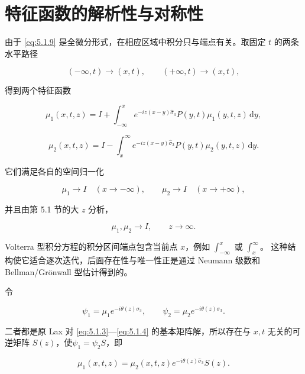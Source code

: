 \documentclass[
    lang=cn,
    scheme=chinese,
    mode=simple,
    device=normal,
    color=blue,
    math=cm,
    thmcnt=section,
    12pt,
    nowatermark
]{elegantbook}
\begin{document}
\section{特征函数的解析性与对称性}

由于 \eqref{eq:5.1.9} 是全微分形式，在相应区域中积分只与端点有关。取固定 $t$ 的两条水平路径

\[
    (-\infty,t)\to(x,t),
    \qquad
    (+\infty,t)\to(x,t),
\]

得到两个特征函数

\begin{equation}
    \mu_1(x,t,z)
    =
    I+
    \int_{-\infty}^{x}
    e^{-iz(x-y)\widehat{\sigma}_3}
    P(y,t)\mu_1(y,t,z)\,\mathrm dy,
    \tag{5.2.1}
    \label{eq:5.2.1}
\end{equation}

\begin{equation}
    \mu_2(x,t,z)
    =
    I-
    \int_x^{\infty}
    e^{-iz(x-y)\widehat{\sigma}_3}
    P(y,t)\mu_2(y,t,z)\,\mathrm dy.
    \tag{5.2.2}
    \label{eq:5.2.2}
\end{equation}

它们满足各自的空间归一化

\[
    \mu_1\to I\quad(x\to-\infty),
    \qquad
    \mu_2\to I\quad(x\to+\infty),
\]

并且由第 5.1 节的大 $z$ 分析，

\[
    \mu_1,\mu_2\to I,\qquad z\to\infty.
\]

\begin{callout}
    Volterra 型积分方程的积分区间端点包含当前点 $x$，例如 $\displaystyle\int_{-\infty}^x$ 或 $\displaystyle\int_x^\infty$。
    这种结构使它适合逐次迭代，后面存在性与唯一性正是通过 Neumann 级数和 Bellman/Grönwall 型估计得到的。
\end{callout}

令

\[
    \psi_1=\mu_1e^{-i\theta(z)\sigma_3},
    \qquad
    \psi_2=\mu_2e^{-i\theta(z)\sigma_3}.
\]

二者都是原 Lax 对 \eqref{eq:5.1.3}---\eqref{eq:5.1.4} 的基本矩阵解，所以存在与 $x,t$ 无关的可逆矩阵 $S(z)$，使$\psi_1=\psi_2S$，即

\begin{equation}
    \mu_1(x,t,z)
    =
    \mu_2(x,t,z)e^{-i\theta(z)\widehat{\sigma}_3}S(z).
    \tag{5.2.3}
    \label{eq:5.2.3}
\end{equation}
\end{document}
